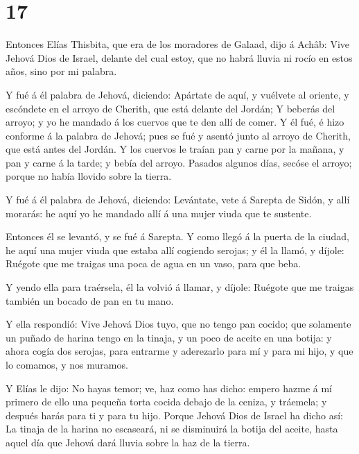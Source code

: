 \hypertarget{section-16}{%
\section{17}\label{section-16}}

 Entonces Elías Thisbita, que era de los moradores de
Galaad, dijo á Achâb: Vive Jehová Dios de Israel, delante del cual
estoy, que no habrá lluvia ni rocío en estos años, sino por mi palabra.

 Y fué á él palabra de Jehová, diciendo: 
Apártate de aquí, y vuélvete al oriente, y escóndete en el arroyo de
Cherith, que está delante del Jordán;  Y beberás del arroyo;
y yo he mandado á los cuervos que te den allí de comer.  Y
él fué, é hizo conforme á la palabra de Jehová; pues se fué y asentó
junto al arroyo de Cherith, que está antes del Jordán.  Y
los cuervos le traían pan y carne por la mañana, y pan y carne á la
tarde; y bebía del arroyo.  Pasados algunos días, secóse el
arroyo; porque no había llovido sobre la tierra.

 Y fué á él palabra de Jehová, diciendo: 
Levántate, vete á Sarepta de Sidón, y allí morarás: he aquí yo he
mandado allí á una mujer viuda que te sustente.

 Entonces él se levantó, y se fué á Sarepta. Y como llegó á
la puerta de la ciudad, he aquí una mujer viuda que estaba allí cogiendo
serojas; y él la llamó, y díjole: Ruégote que me traigas una poca de
agua en un vaso, para que beba.

 Y yendo ella para traérsela, él la volvió á llamar, y
díjole: Ruégote que me traigas también un bocado de pan en tu mano.

 Y ella respondió: Vive Jehová Dios tuyo, que no tengo pan
cocido; que solamente un puñado de harina tengo en la tinaja, y un poco
de aceite en una botija: y ahora cogía dos serojas, para entrarme y
aderezarlo para mí y para mi hijo, y que lo comamos, y nos muramos.

 Y Elías le dijo: No hayas temor; ve, haz como has dicho:
empero hazme á mí primero de ello una pequeña torta cocida debajo de la
ceniza, y tráemela; y después harás para ti y para tu hijo.
 Porque Jehová Dios de Israel ha dicho así: La tinaja de la
harina no escaseará, ni se disminuirá la botija del aceite, hasta aquel
día que Jehová dará lluvia sobre la haz de la tierra.

